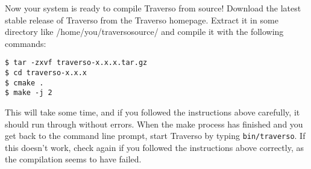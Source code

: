 Now your system is ready to compile Traverso from source! Download the latest stable release of Traverso from the Traverso homepage. Extract it in some directory like /home/you/traversosource/ and compile it with the following commands:

\begin{verbatim}
$ tar -zxvf traverso-x.x.x.tar.gz
$ cd traverso-x.x.x
$ cmake .
$ make -j 2
\end{verbatim}
This will take some time, and if you followed the instructions above carefully, it should run through without errors. When the make process has finished and you get back to the command line prompt, start Traverso by typing \texttt{bin/traverso}. If this doesn't work, check again if you followed the instructions above correctly, as the compilation seems to have failed.
